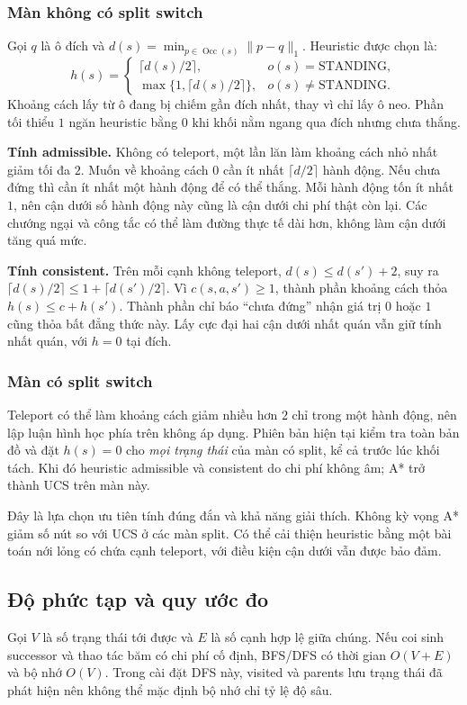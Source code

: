 \subsubsection{Màn không có split switch}
Gọi $q$ là ô đích và $d(s)=\min_{p\in\operatorname{Occ}(s)}\lVert p-q\rVert_1$. Heuristic được chọn là:
\[
h(s)=\begin{cases}
\lceil d(s)/2\rceil,&o(s)=\text{STANDING},\\
\max\{1,\lceil d(s)/2\rceil\},&o(s)\ne\text{STANDING}.
\end{cases}
\]
Khoảng cách lấy từ ô đang bị chiếm gần đích nhất, thay vì chỉ lấy ô neo. Phần tối thiểu $1$ ngăn heuristic bằng $0$ khi khối nằm ngang qua đích nhưng chưa thắng.

\textbf{Tính admissible.} Không có teleport, một lần lăn làm khoảng cách nhỏ nhất giảm tối đa $2$. Muốn về khoảng cách $0$ cần ít nhất $\lceil d/2\rceil$ hành động. Nếu chưa đứng thì cần ít nhất một hành động để có thể thắng. Mỗi hành động tốn ít nhất $1$, nên cận dưới số hành động này cũng là cận dưới chi phí thật còn lại. Các chướng ngại và công tắc có thể làm đường thực tế dài hơn, không làm cận dưới tăng quá mức.

\textbf{Tính consistent.} Trên mỗi cạnh không teleport, $d(s)\le d(s')+2$, suy ra $\lceil d(s)/2\rceil\le1+\lceil d(s')/2\rceil$. Vì $c(s,a,s')\ge1$, thành phần khoảng cách thỏa $h(s)\le c+h(s')$. Thành phần chỉ báo ``chưa đứng'' nhận giá trị $0$ hoặc $1$ cũng thỏa bất đẳng thức này. Lấy cực đại hai cận dưới nhất quán vẫn giữ tính nhất quán, với $h=0$ tại đích.

\subsubsection{Màn có split switch}
Teleport có thể làm khoảng cách giảm nhiều hơn $2$ chỉ trong một hành động, nên lập luận hình học phía trên không áp dụng. Phiên bản hiện tại kiểm tra toàn bản đồ và đặt $h(s)=0$ cho \emph{mọi trạng thái} của màn có split, kể cả trước lúc khối tách. Khi đó heuristic admissible và consistent do chi phí không âm; A* trở thành UCS trên màn này.

Đây là lựa chọn ưu tiên tính đúng đắn và khả năng giải thích. Không kỳ vọng A* giảm số nút so với UCS ở các màn split. Có thể cải thiện heuristic bằng một bài toán nới lỏng có chứa cạnh teleport, với điều kiện cận dưới vẫn được bảo đảm.

\subsection{Độ phức tạp và quy ước đo}
Gọi $V$ là số trạng thái tới được và $E$ là số cạnh hợp lệ giữa chúng. Nếu coi sinh successor và thao tác băm có chi phí cố định, BFS/DFS có thời gian $O(V+E)$ và bộ nhớ $O(V)$. Trong cài đặt DFS này, visited và parents lưu trạng thái đã phát hiện nên không thể mặc định bộ nhớ chỉ tỷ lệ độ sâu.

